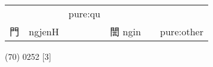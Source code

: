 \documentclass[14pt,a4paper]{scrartcl}
\begin{document}
\begin{longtable}[c]{@{}llllll@{}}
\begin{minipage}[t]{0.14\columnwidth}\raggedright\strut
\strut\end{minipage} &
\begin{minipage}[t]{0.14\columnwidth}\raggedright\strut
\strut\end{minipage} &
\begin{minipage}[t]{0.14\columnwidth}\raggedright\strut
pure:qu
\strut\end{minipage}\tabularnewline
\begin{minipage}[t]{0.14\columnwidth}\raggedright\strut
門
\strut\end{minipage} &
\begin{minipage}[t]{0.14\columnwidth}\raggedright\strut
ngjenH
\strut\end{minipage} &
\begin{minipage}[t]{0.14\columnwidth}\raggedright\strut
\strut\end{minipage} &
\begin{minipage}[t]{0.14\columnwidth}\raggedright\strut
誾 ngin
\strut\end{minipage} &
\begin{minipage}[t]{0.14\columnwidth}\raggedright\strut
\strut\end{minipage} &
\begin{minipage}[t]{0.14\columnwidth}\raggedright\strut
pure:other
\strut\end{minipage}\tabularnewline
\bottomrule
\end{longtable}

(70) 0252 {[}3{]}
\end{document}
